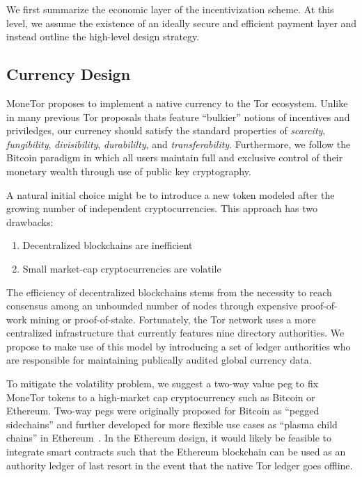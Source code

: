 We first summarize the economic layer of the incentivization scheme. At this
level, we assume the existence of an ideally secure and efficient payment layer
and instead outline the high-level design strategy.

\subsection{Currency Design}

MoneTor proposes to implement a native currency to the Tor ecosystem. Unlike in
many previous Tor proposals thats feature ``bulkier'' notions of incentives and
priviledges, our currency should satisfy the standard properties of
\textit{scarcity}, \textit{fungibility}, \textit{divisibility},
\textit{durabililty}, and \textit{transferability}.  Furthermore, we
follow the Bitcoin paradigm in which all users maintain full and exclusive
control of their monetary wealth through use of public key cryptography.

A natural initial choice might be to introduce a new token modeled after the
growing number of independent cryptocurrencies. This approach has two drawbacks:

\begin{enumerate}
\item Decentralized blockchains are inefficient
\item Small market-cap cryptocurrencies are volatile
\end{enumerate}

The efficiency of decentralized blockchains stems from the necessity to reach
consensus among an unbounded number of nodes through expensive proof-of-work
mining or proof-of-stake. Fortunately, the Tor network uses a more centralized
infrastructure that currently features nine directory authorities. We propose to
make use of this model by introducing a set of ledger authorities who are
responsible for maintaining publically audited global currency data.

To mitigate the volatility problem, we suggest a two-way value peg to fix
MoneTor tokens to a high-market cap cryptocurrency such as Bitcoin or
Ethereum. Two-way pegs were originally proposed for Bitcoin as ``pegged
sidechains'' and further developed for more flexible use cases as ``plasma child
chains'' in Ethereum~\cite{back2014enabling, poon2017plasma}. In the Ethereum
design, it would likely be feasible to integrate smart contracts such that the
Ethereum blockchain can be used as an authority ledger of last resort in the
event that the native Tor ledger goes offline.

